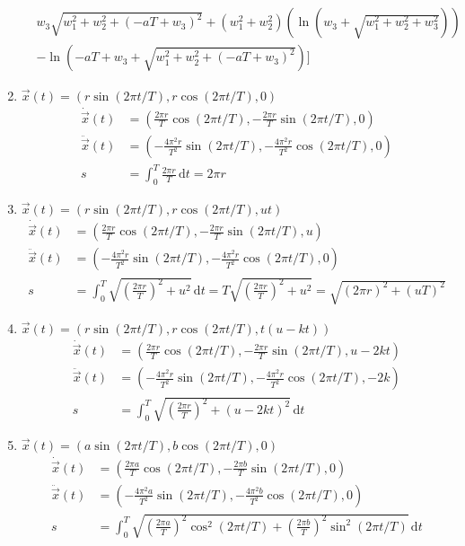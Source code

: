\documentclass[11pt,answers]{exam}
\begin{document}
\begin{questions}
\begin{solution}
\begin{enumerate}
\begin{align*}
\\
&
w_3\sqrt{w_1^2+w_2^2+(-aT+w_3)^2}+(w_1^2+w_2^2)\left(\ln(w_3+\sqrt{w_1^2+w_2^2+w_3^2})\right)
\\
&
-\ln(-aT+w_3+\sqrt{w_1^2+w_2^2+(-aT+w_3)^2})
\Bigg]
\end{align*}
\item $\vec{x}(t)=(r\sin(2\pi t/T),r\cos(2\pi t/T),0)$
\begin{align*}
\dot{\vec{x}}(t)&=\left(\frac{2\pi r}{T}\cos(2\pi t/T),
-\frac{2\pi r}{T}\sin(2\pi t/T),0\right)
\\
\ddot{\vec{x}}(t)&=\left(-\frac{4\pi^2 r}{T^2}\sin(2\pi t/T),
-\frac{4\pi^2 r}{T^2}\cos(2\pi t/T),0\right)
\\
s&=\int_0^T\frac{2\pi r}{T}\,\mathrm dt
=2\pi r
\end{align*}
\item $\vec{x}(t)=(r\sin(2\pi t/T),r\cos(2\pi t/T),ut)$
\begin{align*}
\dot{\vec{x}}(t)&=\left(\frac{2\pi r}{T}\cos(2\pi t/T),
-\frac{2\pi r}{T}\sin(2\pi t/T),u\right)
\\
\ddot{\vec{x}}(t)&=\left(-\frac{4\pi^2 r}{T^2}\sin(2\pi t/T),
-\frac{4\pi^2 r}{T^2}\cos(2\pi t/T),0\right)
\\
s&=\int_0^T\sqrt{\left(\frac{2\pi r}{T}\right)^2+u^2}\,\mathrm dt
=T\sqrt{\left(\frac{2\pi r}{T}\right)^2+u^2}
=\sqrt{(2\pi r)^2+(u T)^2}
\end{align*}
\item $\vec{x}(t)=(r\sin(2\pi t/T),r\cos(2\pi t/T),t(u-kt))$
\begin{align*}
\dot{\vec{x}}(t)&=\left(\frac{2\pi r}{T}\cos(2\pi t/T),
-\frac{2\pi r}{T}\sin(2\pi t/T),u-2kt\right)
\\
\ddot{\vec{x}}(t)&=\left(-\frac{4\pi^2 r}{T^2}\sin(2\pi t/T),
-\frac{4\pi^2 r}{T^2}\cos(2\pi t/T),-2k\right)
\\
s&=\int_0^T\sqrt{\left(\frac{2\pi r}{T}\right)^2+(u-2kt)^2}\,\mathrm dt
\end{align*}
\item $\vec{x}(t)=(a\sin(2\pi t/T),b\cos(2\pi t/T),0)$
\begin{align*}
\dot{\vec{x}}(t)&=\left(\frac{2\pi a}{T}\cos(2\pi t/T),
-\frac{2\pi b}{T}\sin(2\pi t/T),0\right)
\\
\ddot{\vec{x}}(t)&=\left(-\frac{4\pi^2 a}{T^2}\sin(2\pi t/T),
-\frac{4\pi^2 b}{T^2}\cos(2\pi t/T),0\right)
\\
s&=\int_0^T\sqrt{\left(\frac{2\pi a}{T}\right)^2\cos^2(2\pi t/T)+
\left(\frac{2\pi b}{T}\right)^2\sin^2(2\pi t/T)}\,\mathrm dt

\end{align*}
\end{enumerate}
\end{solution}
\end{questions}
\end{document}
